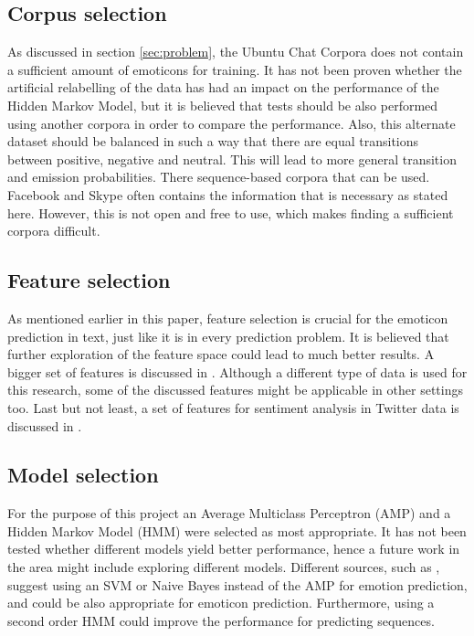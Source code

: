 \subsection{Corpus selection}
As discussed in section \ref{sec:problem}, the Ubuntu Chat Corpora does not contain a sufficient amount of emoticons for training. It has not been proven whether the artificial relabelling of the data has had an impact on the performance of the Hidden Markov Model, but it is believed that tests should be also performed using another corpora in order to compare the performance. Also, this alternate dataset should be balanced in such a way that there are equal transitions between positive, negative and neutral. This will lead to more general transition and emission probabilities. There sequence-based corpora that can be used. Facebook and Skype often contains the information that is necessary as stated here. However, this is not open and free to use, which makes finding a sufficient corpora difficult. %

\subsection{Feature selection}

As mentioned earlier in this paper, feature selection is crucial for the emoticon prediction in text, just like it is in every prediction problem. It is believed that further exploration of the feature space could lead to much better results. A bigger set of features is discussed in \cite{fairytales}. Although a different type of data is used for this research, some of the discussed features might be applicable in other settings too. Last but not least, a set of features for sentiment analysis in Twitter data is discussed in \cite{twittersentiment}.

\subsection{Model selection}

For the purpose of this project an Average Multiclass Perceptron (AMP) and a Hidden Markov Model (HMM) were selected as most appropriate. It has not been tested whether different models yield better performance, hence a future work in the area might include exploring different models. Different sources, such as \cite{emotionclassifiers}, suggest using an SVM or Naive Bayes instead of the AMP for emotion prediction, and could be also appropriate for emoticon prediction. Furthermore, using a second order HMM could improve the performance for predicting sequences.



